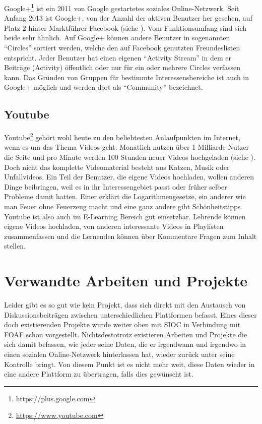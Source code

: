 Google+\footnote{https://plus.google.com} ist ein 2011 von Google gestartetes soziales Online-Netzwerk. Seit Anfang 2013 ist Google+, von der Anzahl der aktiven Benutzer her gesehen, auf Platz 2 hinter Marktführer Facebook (siehe \cite{Thomas2013}). Vom Funktionsumfang sind sich beide sehr ähnlich. Auf Google+ können andere Benutzer in sogenannten \enquote{Circles} sortiert werden, welche den auf Facebook genutzten Freundeslisten entspricht. Jeder Benutzer hat einen eigenen \enquote{Activity Stream} in dem er Beiträge (Activity) öffentlich oder nur für ein oder mehrere Circles verfassen kann. Das Gründen von Gruppen für bestimmte Interessensbereiche ist auch in Google+ möglich und werden dort als \enquote{Community} bezeichnet.


\subsection{Youtube} %
\label{sub:youtube}

Youtube\footnote{\url{https://www.youtube.com}} gehört wohl heute zu den beliebtesten Anlaufpunkten im Internet, wenn es um das Thema Videos geht. Monatlich nutzen über 1 Milliarde Nutzer die Seite und pro Minute werden 100 Stunden neuer Videos hochgeladen (siehe \cite{youtube2013statistics}). Doch nicht das komplette Videomaterial besteht aus Katzen, Musik oder Unfallvideos. Ein Teil der Benutzer, die eigene Videos hochladen, wollen anderen Dinge beibringen, weil es in ihr Interessengebiet passt oder früher selber Probleme damit hatten. Einer erklärt die Logarithmengesetze, ein anderer wie man Feuer ohne Feuerzeug macht und eine ganz andere gibt Schönheitstipps. Youtube ist also auch im E-Learning Bereich gut einsetzbar. Lehrende können eigene Videos hochladen, von anderen interessante Videos in Playlisten zusammenfassen und die Lernenden können über Kommentare Fragen zum Inhalt stellen. 



\section{Verwandte Arbeiten und Projekte} %
\label{sec:verwandte_arbeiten_und_projekte}

Leider gibt es so gut wie kein Projekt, dass sich direkt mit den Austausch von Diskussionsbeiträgen zwischen unterschiedlichen Plattformen befasst. Eines dieser doch existierenden Projekte wurde weiter oben mit SIOC in Verbindung mit FOAF schon vorgestellt. Nichtsdestotrotz existieren Arbeiten und Projekte die sich damit befassen, wie jeder seine Daten, die er irgendwann und irgendwo in einen sozialen Online-Netzwerk hinterlassen hat, wieder zurück unter seine Kontrolle bringt. Von diesem Punkt ist es nicht mehr weit, diese Daten wieder in eine andere Plattform zu übertragen, falls dies gewünscht ist.  

